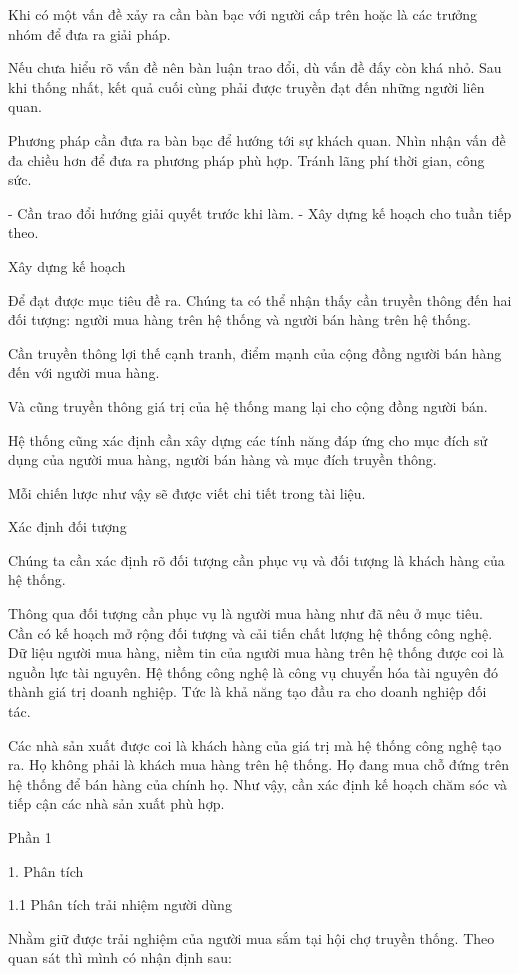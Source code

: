 \documentclass{report}
\begin{document}
Khi có một vấn đề xảy ra cần bàn bạc với người cấp trên hoặc là các trưởng nhóm để đưa ra giải pháp.

Nếu chưa hiểu rõ vấn đề nên bàn luận trao đổi, dù vấn đề đấy còn khá nhỏ. Sau khi thống nhất, kết quả cuối cùng phải
được truyền đạt đến những người liên quan.

Phương pháp cần đưa ra bàn bạc để hướng tới sự khách quan. Nhìn nhận vấn đề đa chiều hơn để đưa ra phương pháp phù hợp.
Tránh lãng phí thời gian, công sức.

- Cần trao đổi hướng giải quyết trước khi làm.
- Xây dựng kế hoạch cho tuần tiếp theo.

Xây dựng kế hoạch

Để đạt được mục tiêu đề ra. Chúng ta có thể nhận thấy cần truyền thông đến hai đối tượng: người mua hàng trên hệ thống
và người bán hàng trên hệ thống.

Cần truyền thông lợi thế cạnh tranh, điểm mạnh của cộng đồng người bán hàng đến với người mua hàng.

Và cũng truyền thông giá trị của hệ thống mang lại cho cộng đồng người bán.

Hệ thống cũng xác định cần xây dựng các tính năng đáp ứng cho mục đích sử dụng của người mua hàng, người bán hàng và mục
đích truyền thông.

Mỗi chiến lược như vậy sẽ được viết chi tiết trong tài liệu.

Xác định đối tượng

Chúng ta cần xác định rõ đối tượng cần phục vụ và đối tượng là khách hàng của hệ thống.

Thông qua đối tượng cần phục vụ là người mua hàng như đã nêu ở mục tiêu. Cần có kế hoạch mở rộng đối tượng và cải tiến
chất lượng hệ thống công nghệ. Dữ liệu người mua hàng, niềm tin của người mua hàng trên hệ thống được coi là nguồn lực
tài nguyên. Hệ thống công nghệ là công vụ chuyển hóa tài nguyên đó thành giá trị doanh nghiệp. Tức là khả năng tạo đầu
ra cho doanh nghiệp đối tác.

Các nhà sản xuất được coi là khách hàng của giá trị mà hệ thống công nghệ tạo ra. Họ không phải là khách mua hàng trên
hệ thống. Họ đang mua chỗ đứng trên hệ thống để bán hàng của chính họ. Như vậy, cần xác định kế hoạch chăm sóc và tiếp
cận các nhà sản xuất phù hợp.

Phần 1

1. Phân tích

1.1 Phân tích trải nhiệm người dùng

Nhằm giữ được trải nghiệm của người mua sắm tại hội chợ truyền thống. Theo quan sát thì mình có nhận định sau:
\end{document}
